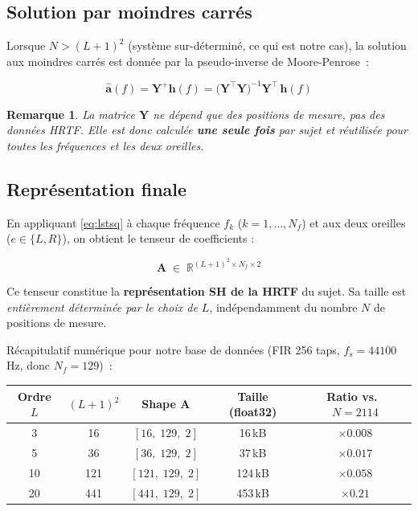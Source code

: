 \documentclass[12pt, a4paper]{article}
\newtheorem{remarque}{Remarque}
\begin{document}
\subsection{Solution par moindres carrés}

Lorsque $N > (L+1)^2$ (système sur-déterminé, ce qui est notre cas), la solution
aux moindres carrés est donnée par la pseudo-inverse de Moore-Penrose~:

\begin{equation}
    \boxed{
    \hat{\mathbf{a}}(f) = \mathbf{Y}^+ \mathbf{h}(f)
    = \bigl(\mathbf{Y}^\top \mathbf{Y}\bigr)^{-1} \mathbf{Y}^\top\, \mathbf{h}(f)
    }
    \label{eq:lstsq}
\end{equation}

\begin{remarque}
La matrice $\mathbf{Y}$ ne dépend \emph{que} des positions de mesure, pas des
données HRTF. Elle est donc calculée \textbf{une seule fois} par sujet et
réutilisée pour toutes les fréquences et les deux oreilles.
\end{remarque}

\subsection{Représentation finale}

En appliquant \eqref{eq:lstsq} à chaque fréquence $f_k$ ($k = 1, \ldots, N_f$)
et aux deux oreilles ($e \in \{L, R\}$), on obtient le tenseur de coefficients :

\begin{equation}
    \mathbf{A} \;\in\; \mathbb{R}^{(L+1)^2 \times N_f \times 2}
\end{equation}

Ce tenseur constitue la \textbf{représentation SH de la HRTF} du sujet.
Sa taille est \emph{entièrement déterminée par le choix de $L$}, indépendamment
du nombre $N$ de positions de mesure.

\medskip

\noindent Récapitulatif numérique pour notre base de données (FIR 256 taps,
$f_s = 44100$\,Hz, donc $N_f = 129$)~:

\begin{center}
\begin{tabular}{ccccc}
\toprule
Ordre $L$ & $(L+1)^2$ & Shape $\mathbf{A}$ & Taille (float32) & Ratio vs.\ $N=2114$ \\
\midrule
3  & 16  & $[16,\;129,\;2]$  & 16\,kB  & $\times 0.008$ \\
5  & 36  & $[36,\;129,\;2]$  & 37\,kB  & $\times 0.017$ \\
10 & 121 & $[121,\;129,\;2]$ & 124\,kB & $\times 0.058$ \\
20 & 441 & $[441,\;129,\;2]$ & 453\,kB & $\times 0.21$  \\
\bottomrule
\end{tabular}
\end{center}
\end{document}
